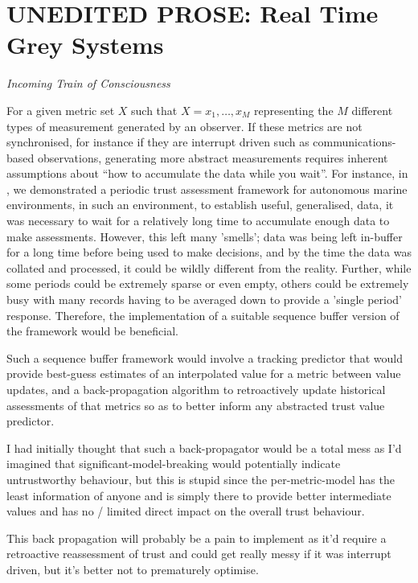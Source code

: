 \section{UNEDITED PROSE: Real Time Grey Systems}
\emph{Incoming Train of Consciousness}


For a given metric set $X$ such that $X = {x_1,\dots,x_M}$ representing the $M$ different types of measurement generated by an observer. If these metrics are not synchronised, for instance if they are interrupt driven such as communications-based observations, generating more abstract measurements requires inherent assumptions about ``how to accumulate the data while you wait''. For instance, in \cite{Bolster2015}, we demonstrated a periodic trust assessment framework for autonomous marine environments, in such an environment, to establish useful, generalised, data, it was necessary to wait for a relatively long time to accumulate enough data to make assessments.
However, this left many 'smells'; data was being left in-buffer for a long time before being used to make decisions, and by the time the data was collated and processed, it could be wildly different from the reality. Further, while some periods could be extremely sparse or even empty, others could be extremely busy with many records having to be averaged down to provide a 'single period' response. 
Therefore, the implementation of a suitable sequence buffer version of the framework would be beneficial.

Such a sequence buffer framework would involve a tracking predictor that would provide best-guess estimates of an interpolated value for a metric between value updates, and a back-propagation algorithm to retroactively update historical assessments of that metrics so as to better inform any abstracted trust value predictor.

I had initially thought that such a back-propagator would be a total mess as I'd imagined that significant-model-breaking would potentially indicate untrustworthy behaviour, but this is stupid since the per-metric-model has the least information of anyone and is simply there to provide better intermediate values and has no / limited direct impact on the overall trust behaviour. 

This back propagation will probably be a pain to implement as it'd require a retroactive reassessment of trust and could get really messy if it was interrupt driven, but it's better not to prematurely optimise.


